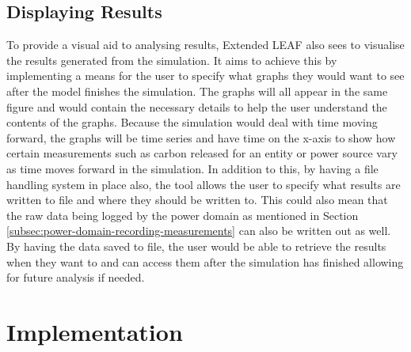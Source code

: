 \documentclass{l4proj}
\begin{document}
\section{Displaying Results}\label{sec:displaying results}
To provide a visual aid to analysing results, Extended LEAF also sees to visualise the results generated from the simulation.
It aims to achieve this by implementing a means for the user to specify what graphs they would want to see after the model finishes the simulation.
The graphs will all appear in the same figure and would contain the necessary details to help the user understand the contents of the graphs.
Because the simulation would deal with time moving forward, the graphs will be time series and have time on the x-axis to show how certain measurements such as carbon released for an entity or power source vary as time moves forward in the simulation.
In addition to this, by having a file handling system in place also, the tool allows the user to specify what results are written to file and where they should be written to.
This could also mean that the raw data being logged by the power domain as mentioned in Section \ref{subsec:power-domain-recording-measurements} can also be written out as well.
By having the data saved to file, the user would be able to retrieve the results when they want to and can access them after the simulation has finished allowing for future analysis if needed.
\chapter{Implementation}\label{chp:imp}

\end{document}
